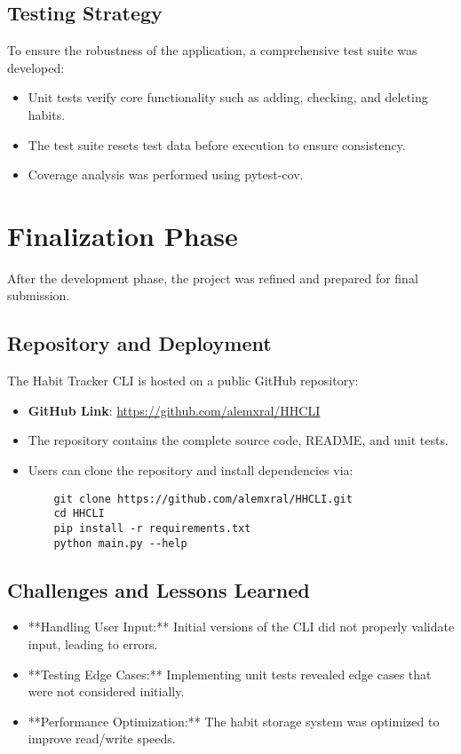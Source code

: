 \documentclass[a4paper,12pt]{article}
\begin{document}
\subsection{Testing Strategy}
To ensure the robustness of the application, a comprehensive test suite was developed:
\begin{itemize}
    \item Unit tests verify core functionality such as adding, checking, and deleting habits.
    \item The test suite resets test data before execution to ensure consistency.
    \item Coverage analysis was performed using pytest-cov.
\end{itemize}

\section{Finalization Phase}
After the development phase, the project was refined and prepared for final submission.

\subsection{Repository and Deployment}
The Habit Tracker CLI is hosted on a public GitHub repository:
\begin{itemize}
    \item \textbf{GitHub Link}: \href{https://github.com/alemxral/HHCLI}{https://github.com/alemxral/HHCLI}
    \item The repository contains the complete source code, README, and unit tests.
    \item Users can clone the repository and install dependencies via:
    \begin{lstlisting}
    git clone https://github.com/alemxral/HHCLI.git
    cd HHCLI
    pip install -r requirements.txt
    python main.py --help
    \end{lstlisting}
\end{itemize}

\subsection{Challenges and Lessons Learned}
\begin{itemize}
    \item **Handling User Input:** Initial versions of the CLI did not properly validate input, leading to errors.
    \item **Testing Edge Cases:** Implementing unit tests revealed edge cases that were not considered initially.
    \item **Performance Optimization:** The habit storage system was optimized to improve read/write speeds.
\end{itemize}
\end{document}
